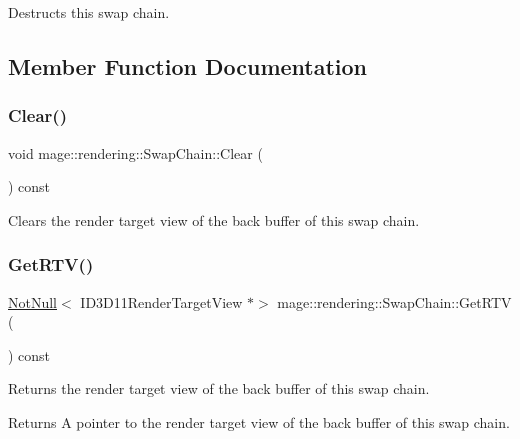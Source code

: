 Destructs this swap chain. 

\subsection{Member Function Documentation}
\mbox{\label{classmage_1_1rendering_1_1_swap_chain_ab834da2afc837fe4c113f86c300af264}} 
\subsubsection{\texorpdfstring{Clear()}{Clear()}}
{\footnotesize\ttfamily void mage\+::rendering\+::\+Swap\+Chain\+::\+Clear (\begin{DoxyParamCaption}{ }\end{DoxyParamCaption}) const\hspace{0.3cm}{\ttfamily [noexcept]}}

Clears the render target view of the back buffer of this swap chain. \mbox{\label{classmage_1_1rendering_1_1_swap_chain_afa9c115a04dac008228c668169dd8bd5}} 
\subsubsection{\texorpdfstring{Get\+R\+T\+V()}{GetRTV()}}
{\footnotesize\ttfamily \mbox{\hyperlink{namespacemage_a8769f9d670d6b585ea306cb1062af94b}{Not\+Null}}$<$ I\+D3\+D11\+Render\+Target\+View $\ast$$>$ mage\+::rendering\+::\+Swap\+Chain\+::\+Get\+R\+TV (\begin{DoxyParamCaption}{ }\end{DoxyParamCaption}) const\hspace{0.3cm}{\ttfamily [noexcept]}}

Returns the render target view of the back buffer of this swap chain.

\begin{DoxyReturn}{Returns}
A pointer to the render target view of the back buffer of this swap chain. 
\end{DoxyReturn}
\mbox{\label{classmage_1_1rendering_1_1_swap_chain_ab140a96957564646ec81eabaa6ea7522}} 
